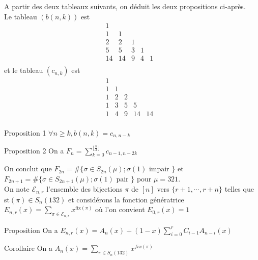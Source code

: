 \begin{frame}
    A partir des deux tableaux suivants, on déduit les deux propositions ci-après.\\
Le tableau $(b(n, k))$ est
$$
	\begin{matrix}
		1  &                  \\
		1  & 1  &             \\
		2  & 2  & 1 &         \\
		5  & 5  & 3 & 1 &     \\
		14 & 14 & 9 & 4 & 1 & \\
	\end{matrix}
$$
et le tableau $(c_{n, k})$ est
$$
	\begin{matrix}
		1 &                   \\
		1 & 1 &               \\
		1 & 2 & 2 &           \\
		1 & 3 & 5 & 5  &      \\
		1 & 4 & 9 & 14 & 14 & \\
	\end{matrix}
$$
\end{frame}
\begin{frame}
    \transfade
    \begin{block}{Proposition 1}
        $\forall n\geq k, b(n,k)=c_{n, n-k}$
    \end{block}
    \pause
    \begin{block}{Proposition 2}
        On a $F_{n} = \sum\limits_{k=0}^{\lfloor \frac{n}{2} \rfloor}c_{n-1, n-2k}$
    \end{block}
\end{frame}

\begin{frame}
    \transfade
    On conclut que $F_{2n}=\#\{ \sigma \in S_{2n}(\mu); \sigma(1) \text{ impair }\}$ et $F_{2n+1} = \#\{\sigma\in S_{2n+1}(\mu); \sigma(1) \text{ pair }\}$ pour $\mu=321$. \\
    \vspace{5pt} On note $\mathcal{E}_{n,r}$ l'ensemble des bijections $\pi$ de $[n]$ vers $\{r+1, \cdots, r+n\}$ telles que
    st$(\pi) \in S_{n}(132)$ et considérons la fonction génératrice $E_{n,r}(x) = \underset{\pi \in \mathcal{E}_{n,r}}{\sum}x^{\text{fix}(\pi)}$
    où l'on convient $E_{0,r}(x)=1$
    \begin{block}{Proposition}
        On a $E_{n, r}(x)=A_{n}(x) + (1-x)\sum\limits_{i=0}^{r}C_{i-1}A_{n-i}(x)$
    \end{block}
    \pause
    \begin{block}{Corollaire}
        On a $A_{n}(x) = \sum\limits_{\pi \in S_{n}(132)}x^{fix(\pi)}$
    \end{block}
\end{frame}
\begin{frame}
\end{frame}